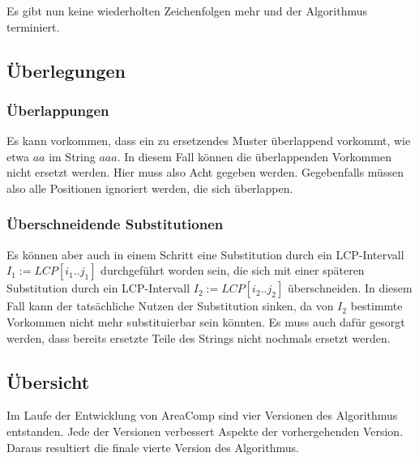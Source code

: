 Es gibt nun keine wiederholten Zeichenfolgen mehr und der Algorithmus terminiert.

\subsection{Überlegungen}

\subsubsection{Überlappungen}

Es kann vorkommen, dass ein zu ersetzendes Muster überlappend vorkommt, wie etwa $aa$ im String $aaa$. In diesem Fall können die überlappenden Vorkommen nicht ersetzt werden. Hier muss also Acht gegeben werden. Gegebenfalls müssen also alle Positionen ignoriert werden, die sich überlappen.

\subsubsection{Überschneidende Substitutionen}

Es können aber auch in einem Schritt eine Substitution durch ein LCP-Intervall $I_1 := LCP[i_1..j_1]$ durchgeführt worden sein, die sich mit einer späteren Substitution durch ein LCP-Intervall $I_2 := LCP[i_2..j_2]$ überschneiden. In diesem Fall kann der tatsächliche Nutzen der Substitution sinken, da von $I_2$ bestimmte Vorkommen nicht mehr substituierbar sein könnten. Es muss auch dafür gesorgt werden, dass bereits ersetzte Teile des Strings nicht nochmals ersetzt werden.

\subsection{Übersicht}

Im Laufe der Entwicklung von AreaComp sind vier Versionen des Algorithmus entstanden. Jede der Versionen verbessert Aspekte der vorhergehenden Version. Daraus resultiert die finale vierte Version des Algorithmus.

